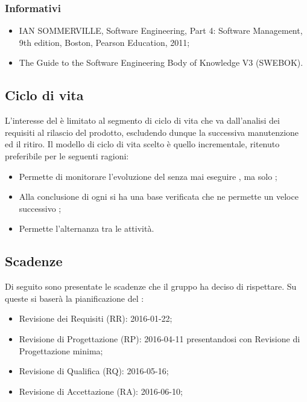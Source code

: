 \subsubsection{Informativi}
\begin{itemize}
\item IAN SOMMERVILLE, Software Engineering, Part 4: Software Management, 9th edition, Boston, Pearson Education, 2011;
\item The Guide to the Software Engineering Body of Knowledge V3 (SWEBOK).
\end{itemize}

\subsection{Ciclo di vita}
L’interesse del  è limitato al segmento di ciclo di vita che va dall’analisi dei requisiti al
rilascio del prodotto, escludendo dunque la successiva manutenzione ed il ritiro. Il modello di ciclo di
vita scelto \`e quello incrementale, ritenuto preferibile per le seguenti ragioni:
\begin{itemize}
\item Permette di monitorare l'evoluzione del  senza mai eseguire , ma solo ;
\item Alla conclusione di ogni  si ha una base verificata che ne permette un veloce successivo ;
\item Permette l'alternanza tra le attivit\`a.
\end{itemize}

\subsection{Scadenze}
Di seguito sono presentate le scadenze che il gruppo ha deciso di rispettare. Su queste si baserà la pianificazione del :
\begin{itemize}
\item Revisione dei Requisiti (RR): 2016-01-22;
\item Revisione di Progettazione (RP): 2016-04-11 presentandosi con Revisione di Progettazione minima; 
\item Revisione di Qualifica (RQ): 2016-05-16;
\item Revisione di Accettazione (RA): 2016-06-10;
\end{itemize}

